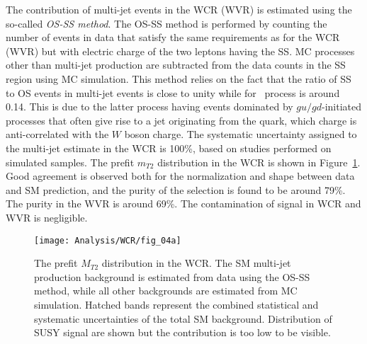 	The contribution of multi-jet events in the WCR (WVR) is estimated using the so-called \textit{OS-SS method}. The OS-SS method is performed by counting the number of events in data that satisfy the same requirements  as for the WCR (WVR) but with electric charge of the two leptons having the \ac{SS}. \ac{MC} processes other than multi-jet production are subtracted from the data counts in the \ac{SS} region using \ac{MC} simulation. This method relies on the fact that the ratio of \ac{SS} to \ac{OS} events in multi-jet events is close to unity while for \Wjets\ process is around 0.14.
	This is due to the latter process having events dominated by $gu/gd$-initiated processes that often give rise to a jet originating from the quark, which charge is anti-correlated with the $W$ boson charge. 
	The systematic uncertainty assigned to the multi-jet estimate in the WCR is 100\%, based on studies performed on simulated samples. 
	The prefit $m_{T2}$ distribution in the WCR is shown in Figure~\ref{fig:WCR}. Good agreement is observed both for the normalization and shape between data and \ac{SM} prediction, and the purity of the \Wjets selection is found to be around 79\%. The purity in the WVR is around 69\%. The contamination of signal  in WCR and WVR is negligible.
	\begin{figure}[!hbt]
		\centering
		\texttt{[image: Analysis/WCR/fig\_04a]}
		\caption{The prefit $M_{T2}$ distribution in the WCR. The \ac{SM} multi-jet production background is estimated from data using the OS-SS method, while all other backgrounds are estimated from  \ac{MC} simulation. Hatched bands represent the combined statistical and systematic uncertainties of the total \ac{SM} background. Distribution of \ac{SUSY} signal are shown but the contribution is too low to be visible. }
	\label{fig:WCR}
	\end{figure}	
	
	
